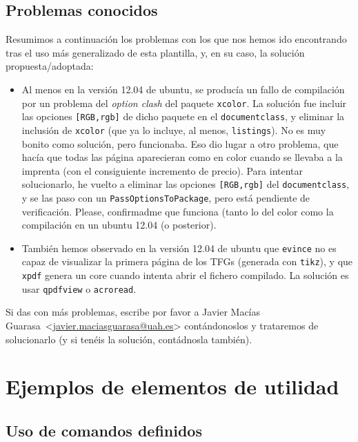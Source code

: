 \documentclass[spanish,openright]{book}
\makeatletter
\newcommand{\myAuthorName}{Javier}
\newcommand{\myAuthorSurname}{Macías Guarasa}
\newcommand{\myAuthorFullName}{\myAuthorName{} \myAuthorSurname{}}
\newcommand{\myAuthorEmail}{javier.maciasguarasa@uah.es}
\newcommand{\contactauthor}{\myAuthorFullName~\textless\href{mailto:\myAuthorEmail}{\myAuthorEmail}\textgreater}
\makeatother
\begin{document}
\subsection{Problemas conocidos}
\label{sec:problemas-conocidos}

Resumimos a continuación los problemas con los que nos hemos ido
encontrando tras el uso más generalizado de esta plantilla, y, en su
caso, la solución propuesta/adoptada:

\begin{itemize}

\item Al menos en la versión 12.04 de ubuntu, se producía un fallo de
compilación por un problema del \textit{option clash} del paquete
\texttt{xcolor}. La solución fue incluir las opciones
\texttt{[RGB,rgb]} de dicho paquete en el \texttt{documentclass}, y
eliminar la inclusión de \texttt{xcolor} (que ya lo incluye, al menos,
\texttt{listings}). No es muy bonito como solución, pero
funcionaba. Eso dio lugar a otro problema, que hacía que todas las
página aparecieran como en color cuando se llevaba a la imprenta (con
el consiguiente incremento de precio). Para intentar solucionarlo, he
vuelto a eliminar las opciones \texttt{[RGB,rgb]} del
\texttt{documentclass}, y se las paso con un
\texttt{PassOptionsToPackage}, pero está pendiente de
verificación. Please, confirmadme que funciona (tanto lo del color
como la compilación en un ubuntu 12.04 (o posterior).

\item También hemos observado en la versión 12.04 de ubuntu que
\texttt{evince} no es capaz de visualizar la primera página de los
TFGs (generada con \texttt{tikz}), y que \texttt{xpdf} genera un core
cuando intenta abrir el fichero compilado. La solución es usar
\texttt{qpdfview} o \texttt{acroread}.

\end{itemize}

Si das con más problemas, escribe por favor a \contactauthor
contándonoslos y trataremos de solucionarlo (y si tenéis la solución,
contádnosla también).


\section{Ejemplos de elementos de utilidad}
\label{sec:ejempl-de-elem}

\subsection{Uso de comandos definidos}
\label{sec:uso-de-comandos}
\end{document}
